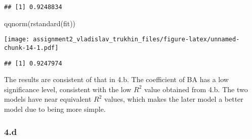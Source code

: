 \documentclass[
]{article}
\newenvironment{Shaded}{\begin{snugshade}}{\end{snugshade}}
\newcommand{\CommentTok}[1]{\textcolor[rgb]{0.56,0.35,0.01}{\textit{#1}}}
\newcommand{\FunctionTok}[1]{\textcolor[rgb]{0.00,0.00,0.00}{#1}}
\newcommand{\NormalTok}[1]{#1}
\newcommand{\OtherTok}[1]{\textcolor[rgb]{0.56,0.35,0.01}{#1}}
\newcommand{\SpecialCharTok}[1]{\textcolor[rgb]{0.00,0.00,0.00}{#1}}
\begin{document}
\begin{verbatim}
## [1] 0.9248834
\end{verbatim}

\begin{Shaded}
\begin{Highlighting}[]
\FunctionTok{qqnorm}\NormalTok{(}\FunctionTok{rstandard}\NormalTok{(fit))}
\end{Highlighting}
\end{Shaded}

\texttt{[image: assignment2\_vladislav\_trukhin\_files/figure-latex/unnamed-chunk-14-1.pdf]}

\begin{Shaded}
\end{Shaded}

\begin{verbatim}
## [1] 0.9247974
\end{verbatim}

The results are consistent of that in 4.b. The coefficient of BA has a
low significance level, consistent with the low \(R^2\) value obtained
from 4.b. The two models have near equivalent \(R^2\) values, which
makes the later model a better model due to being more simple.

\hypertarget{d-1}{%
\subsubsection{4.d}\label{d-1}}
\end{document}
